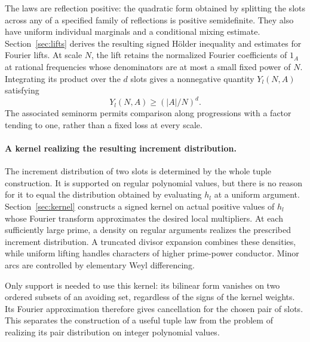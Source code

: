 The laws are reflection positive: the quadratic form obtained by splitting
the slots across any of a specified family of reflections is positive
semidefinite. They also have uniform individual marginals and a conditional
mixing estimate. Section~\ref{sec:lifts} derives the resulting signed
H\"older inequality and estimates for Fourier lifts. At scale $N$, the lift
retains the normalized Fourier coefficients of $1_A$ at rational frequencies
whose denominators are at most a small fixed power of $N$. Integrating its
product over the $d$ slots gives a nonnegative quantity $Y_l(N,A)$ satisfying
\[
 Y_l(N,A)\ge (|A|/N)^d.
\]
The associated seminorm permits comparison along progressions with a factor
tending to one, rather than a fixed loss at every scale.

\paragraph{A kernel realizing the resulting increment distribution.}
The increment distribution of two slots is determined by the whole tuple
construction. It is supported on regular polynomial values, but there is no
reason for it to equal the distribution obtained by evaluating $h_l$ at a
uniform argument. Section~\ref{sec:kernel} constructs a signed kernel on
actual positive values of $h_l$ whose Fourier transform approximates the
desired local multipliers. At each sufficiently large prime, a density on regular arguments
realizes the prescribed increment distribution. A truncated divisor
expansion combines these densities, while uniform lifting handles
characters of higher prime-power conductor. Minor arcs are controlled by
elementary Weyl differencing.

Only support is needed to use this kernel: its bilinear form vanishes on two
ordered subsets of an avoiding set, regardless of the signs of the kernel
weights. Its Fourier approximation therefore gives cancellation for the
chosen pair of slots. This separates the construction of a useful tuple law
from the problem of realizing its pair distribution on integer polynomial
values.

